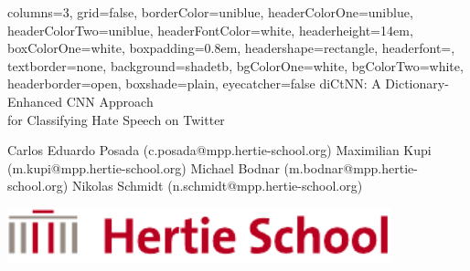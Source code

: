 \documentclass[a0paper,landscape]{baposter}
\begin{document}

\begin{poster}{
  columns=3,
	grid=false,
	borderColor=uniblue,
	headerColorOne=uniblue,
	headerColorTwo=uniblue,
	headerFontColor=white,
  headerheight=14em,
	boxColorOne=white,
  boxpadding=0.8em,
	headershape=rectangle,
	headerfont=\Large\textsf,
	textborder=none,
	background=shadetb,
  bgColorOne=white,
  bgColorTwo=white,
	headerborder=open,
  boxshade=plain,
  eyecatcher=false
}
{
}
{diCtNN: A Dictionary-Enhanced CNN Approach \\ for Classifying Hate Speech on Twitter}
{
  \begin{multicols}{2}
  Carlos Eduardo Posada {\smaller (c.posada@mpp.hertie-school.org)\newline}
  Maximilian Kupi {\smaller (m.kupi@mpp.hertie-school.org)\newline}
  Michael Bodnar {\smaller (m.bodnar@mpp.hertie-school.org)\newline}
  Nikolas Schmidt {\smaller (n.schmidt@mpp.hertie-school.org)}
  \end{multicols}
}
{\begin{minipage}{30.0em}
    \includegraphics[width=30.0em]{hertie}
  \end{minipage}
}


\end{poster}
\end{document}
